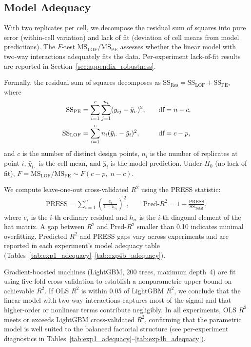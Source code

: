 \subsection{Model Adequacy}

With two replicates per cell, we decompose the residual sum of squares into pure error (within-cell variation) and lack of fit (deviation of cell means from model predictions). The $F$-test $\text{MS}_{\text{LOF}} / \text{MS}_{\text{PE}}$ assesses whether the linear model with two-way interactions adequately fits the data. Per-experiment lack-of-fit results are reported in Section~\ref{sec:appendix_robustness}.

Formally, the residual sum of squares decomposes as $\text{SS}_{\text{Res}} = \text{SS}_{\text{LOF}} + \text{SS}_{\text{PE}}$, where
\begin{align}
  \text{SS}_{\text{PE}} &= \sum_{i=1}^{c} \sum_{j=1}^{n_i} (y_{ij} - \bar{y}_{i\cdot})^2, &\quad \text{df} &= n - c, \notag \\
  \text{SS}_{\text{LOF}} &= \sum_{i=1}^{c} n_i (\bar{y}_{i\cdot} - \hat{y}_i)^2, &\quad \text{df} &= c - p,
  \label{eq:lof}
\end{align}
and $c$ is the number of distinct design points, $n_i$ is the number of replicates at point $i$, $\bar{y}_{i\cdot}$ is the cell mean, and $\hat{y}_i$ is the model prediction. Under $H_0$ (no lack of fit), $F = \text{MS}_{\text{LOF}} / \text{MS}_{\text{PE}} \sim F(c - p,\; n - c)$.

We compute leave-one-out cross-validated $R^2$ using the PRESS statistic:
\begin{align}
  \text{PRESS} = \sum_{i=1}^{n} \left( \frac{e_i}{1 - h_{ii}} \right)^{\!2}, \qquad
  \text{Pred-}R^2 = 1 - \frac{\text{PRESS}}{\text{SS}_{\text{Total}}},
  \label{eq:press}
\end{align}
where $e_i$ is the $i$-th ordinary residual and $h_{ii}$ is the $i$-th diagonal element of the hat matrix. A gap between $R^2$ and Pred-$R^2$ smaller than 0.10 indicates minimal overfitting. Predicted $R^2$ and PRESS gaps vary across experiments and are reported in each experiment's model adequacy table (Tables~\ref{tab:exp1_adequacy}--\ref{tab:exp4b_adequacy}).

Gradient-boosted machines (LightGBM, 200 trees, maximum depth~4) are fit using five-fold cross-validation to establish a nonparametric upper bound on achievable $R^2$. If OLS $R^2$ is within 0.05 of LightGBM $R^2$, we conclude that the linear model with two-way interactions captures most of the signal and that higher-order or nonlinear terms contribute negligibly. In all experiments, OLS $R^2$ meets or exceeds LightGBM cross-validated $R^2$, confirming that the parametric model is well suited to the balanced factorial structure (see per-experiment diagnostics in Tables~\ref{tab:exp1_adequacy}--\ref{tab:exp4b_adequacy}).

